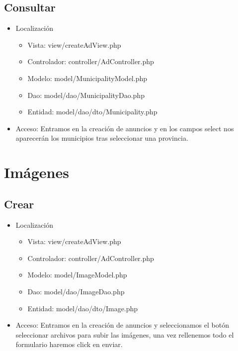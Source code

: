 \subsection{Consultar}
\begin{itemize}
\item Localizaci\'{o}n
\begin{itemize}
\item Vista: view/createAdView.php
\item Controlador: controller/AdController.php
\item Modelo: model/MunicipalityModel.php
\item Dao: model/dao/MunicipalityDao.php
\item Entidad: model/dao/dto/Municipality.php
\end{itemize}
\item Acceso: Entramos en la creaci\'{o}n de anuncios y en los campos select nos aparecer\'{a}n los municipios tras seleccionar una provincia.
\end{itemize}

\section{Im\'{a}genes}

\subsection{Crear}
\begin{itemize}
\item Localizaci\'{o}n
\begin{itemize}
\item Vista: view/createAdView.php
\item Controlador: controller/AdController.php
\item Modelo: model/ImageModel.php
\item Dao: model/dao/ImageDao.php
\item Entidad: model/dao/dto/Image.php
\end{itemize}
\item Acceso: Entramos en la creaci\'{o}n de anuncios y seleccionamos el bot\'{o}n seleccionar archivos para subir las im\'{a}genes, una vez rellenemos todo el formulario haremos click en enviar.
\end{itemize}
